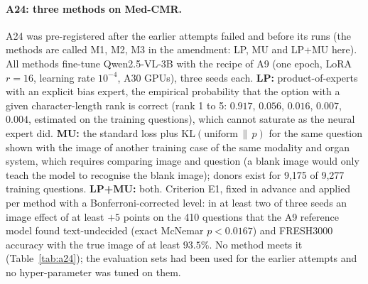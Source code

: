 \label{app:a24}

\paragraph{A24: three methods on Med-CMR.}
A24 was pre-registered after the earlier attempts failed and before its runs (the methods are called M1, M2, M3 in the amendment: LP, MU and LP+MU here).
All methods fine-tune Qwen2.5-VL-3B with the recipe of A9 (one epoch, LoRA $r=16$, learning rate $10^{-4}$, A30 GPUs), three seeds each.
\textbf{LP:} product-of-experts with an explicit bias expert, the empirical probability that the option with a given character-length rank is correct (rank 1 to 5: $0.917$, $0.056$, $0.016$, $0.007$, $0.004$, estimated on the training questions), which cannot saturate as the neural expert did.
\textbf{MU:} the standard loss plus $\mathrm{KL}(\text{uniform}\,\|\,p)$ for the same question shown with the image of another training case of the same modality and organ system, which requires comparing image and question (a blank image would only teach the model to recognise the blank image); donors exist for 9{,}175 of 9{,}277 training questions.
\textbf{LP+MU:} both.
Criterion E1, fixed in advance and applied per method with a Bonferroni-corrected level: in at least two of three seeds an image effect of at least $+5$ points on the 410 questions that the A9 reference model found text-undecided (exact McNemar $p<0.0167$) and FRESH3000 accuracy with the true image of at least $93.5\%$.
No method meets it (Table~\ref{tab:a24}); the evaluation sets had been used for the earlier attempts and no hyper-parameter was tuned on them.


